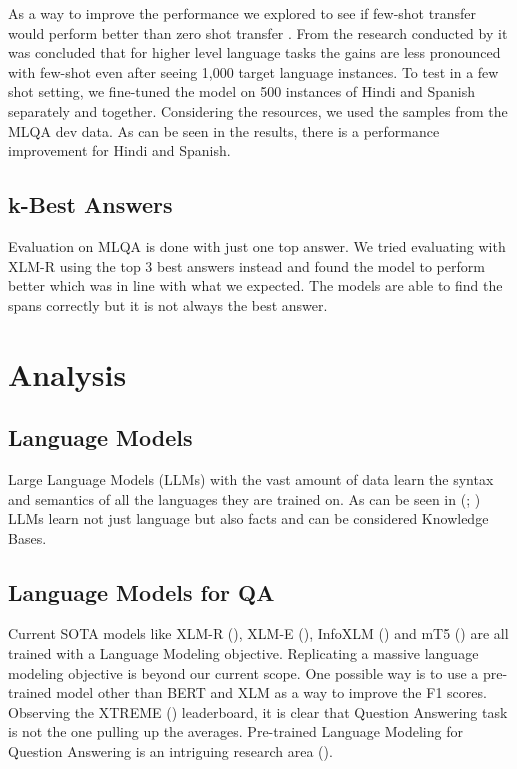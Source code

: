 \documentclass[12pt]{article}   %
\begin{document}
As a way to improve the performance we explored to see if few-shot transfer would perform better than zero shot transfer . From the research conducted by \cite{lauscher-etal-2020-zero} it was concluded that for higher level language tasks the gains are less pronounced with few-shot even after seeing 1,000 target language instances. To test in a few shot setting, we fine-tuned the model on 500 instances of Hindi and Spanish separately and together. Considering the resources, we used the samples from the MLQA dev data. As can be seen in the results, there is a performance improvement for Hindi and Spanish.

\subsection{k-Best Answers}
Evaluation on MLQA is done with just one top answer. We tried evaluating with XLM-R using the top 3 best answers instead and found the model to perform better which was in line with what we expected. The models are able to find the spans correctly but it is not always the best answer.

\section{Analysis}
\subsection{Language Models}
Large Language Models (LLMs) with the vast amount of data learn the syntax and semantics of all the languages they are trained on. As can be seen in (\cite{petroni-etal-2019-language}; \cite{mulfew}) LLMs learn not just language but also facts and can be considered Knowledge Bases.

\subsection{Language Models for QA}
Current SOTA models like XLM-R (\cite{conneau2019unsupervised}), XLM-E (\cite{chi2021xlm}), InfoXLM (\cite{chi-etal-2021-infoxlm}) and mT5 (\cite{xue-etal-2021-mt5}) are all trained with a Language Modeling objective. Replicating a massive language modeling objective is beyond our current scope. One possible way is to use a pre-trained model other than BERT and XLM as a way to improve the F1 scores. Observing the XTREME (\cite{xtreme}) leaderboard, it is clear that Question Answering task is not the one pulling up the averages.  Pre-trained Language Modeling for Question Answering is an intriguing research area (\cite{jnm}).
\end{document}
